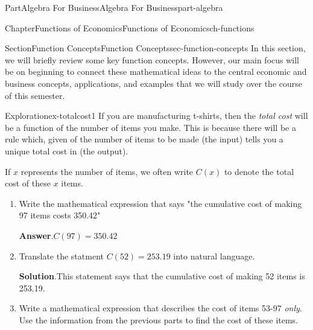 \documentclass{tufte-book}
\newcommand{\blocktitlefont}{\relax}
\numberwithin{equation}{chapter}
\begin{document}
\begin{partptx}{Part}{Algebra For Business}{}{Algebra For Business}{}{}{part-algebra}
\renewcommand*{\partname}{Part}
%
\typeout{************************************************}
\typeout{************************************************}
%
\begin{chapterptx}{Chapter}{Functions of Economics}{}{Functions of Economics}{}{}{ch-functions}
\renewcommand*{\chaptername}{Chapter}
%
%
\typeout{************************************************}
\typeout{************************************************}
%
\begin{sectionptx}{Section}{Function Concepts}{}{Function Concepts}{}{}{sec-function-concepts}
In this section, we will briefly review some key function concepts.  However, our main focus will be on beginning to connect these mathematical ideas to the central economic and business concepts, applications, and examples that we will study over the course of this semester.%
\begin{exploration}{Exploration}{}{ex-totalcost1}%
If you are manufacturing t-shirts, then the \emph{total cost} will be a function  of the number of items you make. This is because there will be a rule which, given  of the number of items to be made (the input) tells you a unique total cost in \textdollar{} (the output).%
\par
If \(x\) represents the number of items, we often write \(C(x)\) to denote the total cost of these \(x\) items.%
\begin{enumerate}[font=\bfseries,label=(\alph*),ref=\alph*]%
\item{}Write the mathematical expression that says "the cumulative cost of making 97 items costs \textdollar{}350.42"%
\par\smallskip%
\noindent\textbf{\blocktitlefont Answer}.\hypertarget{ex-totalcost1-2-2}{}\quad{}\(C(97) = 350.42\)%
\item{}Translate the statment \(C(52) = 253.19\) into natural language.%
\par\smallskip%
\noindent\textbf{\blocktitlefont Solution}.\hypertarget{ex-totalcost1-3-2}{}\quad{}This statement says that the cumulative cost of making 52 items is \textdollar{}253.19.%
\item{}Write a mathematical expression that describes the cost of items 53-97 \emph{only}.  Use the information from the previous parts to find the cost of these items.%
\par\smallskip%

\end{enumerate}
\end{exploration}
\end{sectionptx}
\end{chapterptx}
\end{partptx}
\end{document}
